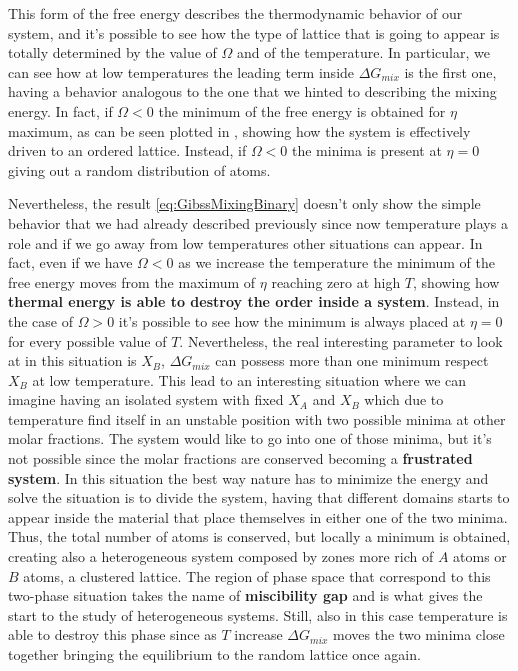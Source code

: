 This form of the free energy describes the thermodynamic behavior of our system, and it's possible to see how the type of lattice that is going to appear is totally determined by the value of $\Omega$ and of the temperature. In particular, we can see how at low temperatures the leading term inside $\Delta G_{mix}$ is the first one, having a behavior analogous to the one that we hinted to describing the mixing energy. In fact, if $\Omega < 0$ the minimum of the free energy is obtained for $\eta$ maximum, as can be seen plotted in , showing how the system is effectively driven to an ordered lattice. Instead, if $\Omega < 0$ the minima is present at $\eta = 0$ giving out a random distribution of atoms.

Nevertheless, the result \eqref{eq:GibssMixingBinary} doesn't only show the simple behavior that we had already described previously since now temperature plays a role and if we go away from low temperatures other situations can appear. In fact, even if we have $\Omega < 0$ as we increase the temperature the minimum of the free energy moves from the maximum of $\eta$ reaching zero at high $T$, showing how \textbf{thermal energy is able to destroy the order inside a system}. Instead, in the case of $\Omega > 0$ it's possible to see how the minimum is always placed at $\eta = 0$ for every possible value of $T$. Nevertheless, the real interesting parameter to look at in this situation is $X_B$, $\Delta G_{mix}$ can possess more than one minimum respect $X_B$ at low temperature. This lead to an interesting situation where we can imagine having an isolated system with fixed $X_A$ and $X_B$ which due to temperature find itself in an unstable position with two possible minima at other molar fractions. The system would like to go into one of those minima, but it's not possible since the molar fractions are conserved becoming a \textbf{frustrated system}. In this situation the best way nature has to minimize the energy and solve the situation is to divide the system, having that different domains starts to appear inside the material that place themselves in either one of the two minima. Thus, the total number of atoms is conserved, but locally a minimum is obtained, creating also a heterogeneous system composed by zones more rich of $A$ atoms or $B$ atoms, a clustered lattice. The region of phase space that correspond to this two-phase situation takes the name of \textbf{miscibility gap} and is what gives the start to the study of heterogeneous systems. Still, also in this case temperature is able to destroy this phase since as $T$ increase $\Delta G_{mix}$ moves the two minima close together bringing the equilibrium to the random lattice once again.

